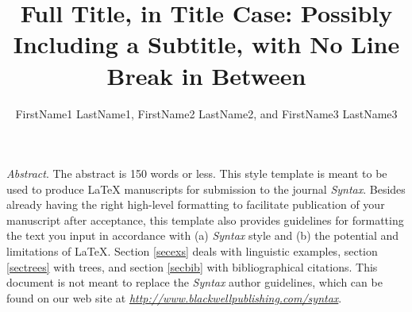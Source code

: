 \documentclass[letterpaper,12pt, twoside]{article}
\begin{document}

\title{Full Title, in Title Case: Possibly Including a Subtitle, with No Line Break in Between}
\author{FirstName1 LastName1, FirstName2 LastName2, and FirstName3 LastName3}

\maketitle


\runninghead




\noindent \textit{Abstract}. The abstract is 150 words or less. This style template is meant to be used to produce \linebreak[1]LaTeX manuscripts for submission to the journal \emph{Syntax}. Besides already having the right high-level formatting to facilitate publication of your manuscript after acceptance, this template also provides guidelines for formatting the text you input in accordance with (a) \emph{Syntax} style and (b) the potential and limitations of LaTeX. Section \ref{secexs} deals with linguistic examples, section \ref{sectrees} with trees, and section \ref{secbib} with bibliographical citations. This document is not meant to replace the \emph{Syntax} author guidelines, which can be found on our web site at \emph{\href{http://www.blackwellpublishing.com/syntax}{http://www.blackwellpublishing.com/syntax}}.
\end{document}
